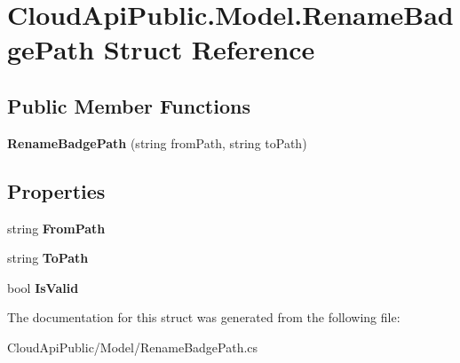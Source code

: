 \hypertarget{struct_cloud_api_public_1_1_model_1_1_rename_badge_path}{\section{Cloud\-Api\-Public.\-Model.\-Rename\-Badge\-Path Struct Reference}
\label{struct_cloud_api_public_1_1_model_1_1_rename_badge_path}
}
\subsection*{Public Member Functions}
\begin{DoxyCompactItemize}
\item 
\hypertarget{struct_cloud_api_public_1_1_model_1_1_rename_badge_path_a3bac730c7ff38a13f6b715c36f01629a}{{\bfseries Rename\-Badge\-Path} (string from\-Path, string to\-Path)}\label{struct_cloud_api_public_1_1_model_1_1_rename_badge_path_a3bac730c7ff38a13f6b715c36f01629a}

\end{DoxyCompactItemize}
\subsection*{Properties}
\begin{DoxyCompactItemize}
\item 
\hypertarget{struct_cloud_api_public_1_1_model_1_1_rename_badge_path_a42624890ab7a21714a33014a0ada7db3}{string {\bfseries From\-Path}}\label{struct_cloud_api_public_1_1_model_1_1_rename_badge_path_a42624890ab7a21714a33014a0ada7db3}

\item 
\hypertarget{struct_cloud_api_public_1_1_model_1_1_rename_badge_path_a714623be59eff84b8b9a26720143dc65}{string {\bfseries To\-Path}}\label{struct_cloud_api_public_1_1_model_1_1_rename_badge_path_a714623be59eff84b8b9a26720143dc65}

\item 
\hypertarget{struct_cloud_api_public_1_1_model_1_1_rename_badge_path_aeb95de3a09ea9b693a272769aa28e000}{bool {\bfseries Is\-Valid}}\label{struct_cloud_api_public_1_1_model_1_1_rename_badge_path_aeb95de3a09ea9b693a272769aa28e000}

\end{DoxyCompactItemize}


The documentation for this struct was generated from the following file\-:\begin{DoxyCompactItemize}
\item 
Cloud\-Api\-Public/\-Model/Rename\-Badge\-Path.\-cs\end{DoxyCompactItemize}

